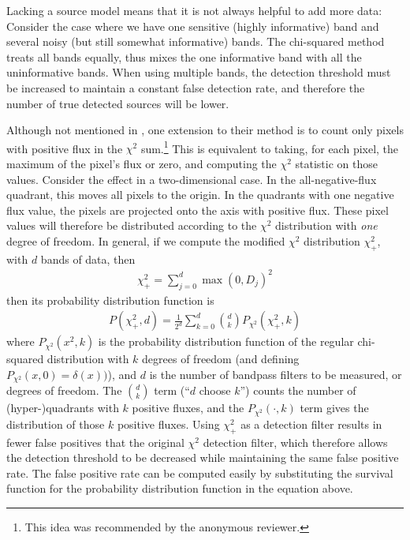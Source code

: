 \documentclass[11pt,letterpaper,linenumbers]{aastex63}
\newcommand{\chipos}{\chi_+}
\begin{document}
Lacking a source model means that it is not always helpful to add more
data: Consider the case where we have one sensitive (highly
informative) band and several noisy (but still somewhat informative)
bands.  The chi-squared method treats all bands equally, thus mixes
the one informative band with all the uninformative bands.  When using
multiple bands, the detection threshold must be increased to maintain
a constant false detection rate, and therefore the number of true
detected sources will be lower.


Although not mentioned in \cite{szalay1999}, one extension to their
method is to count only pixels with positive flux in the $\chi^2$
sum.\footnote{This idea was recommended by the anonymous reviewer.}
This is equivalent to taking, for each pixel, the maximum of the
pixel's flux or zero, and computing the $\chi^2$ statistic on those
values.  Consider the effect in a two-dimensional case.  In the
all-negative-flux quadrant, this moves all pixels to the origin.  In
the quadrants with one negative flux value, the pixels are projected
onto the axis with positive flux.  These pixel values will therefore
be distributed according to the $\chi^2$ distribution with \emph{one}
degree of freedom.  In general, if we compute the modified $\chi^2$
distribution $\chipos^2$, with $d$ bands of data, then
\begin{eqnarray}
  \chipos^2 = \sum_{j=0}^d \max(0, D_j)^2
  \label{eqn:chipos}
\end{eqnarray}
then its probability distribution function is
\begin{eqnarray}
P(\chipos^2, d) = \frac{1}{2^d} \sum_{k=0}^d \binom{d}{k} P_{\chi^2}(\chipos^2, k)
\end{eqnarray}
where $P_{\chi^2}(x^2, k)$ is the probability distribution function of
the regular chi-squared distribution with $k$ degrees of freedom (and
defining $P_{\chi^2}(x, 0) = \delta(x))$), and $d$ is the number of
bandpass filters to be measured, or degrees of freedom.  The
$\binom{d}{k}$ term (``$d$ choose $k$'') counts the number of (hyper-)quadrants with $k$
positive fluxes, and the $P_{\chi^2}(\cdot, k)$ term gives the distribution of those $k$ positive fluxes.  Using
$\chipos^2$ as a detection filter results in fewer false positives
that the original $\chi^2$ detection filter, which therefore allows
the detection threshold to be decreased while maintaining the same
false positive rate.  The false positive rate can be computed easily
by substituting the survival function for the probability distribution
function in the equation above.
\end{document}
